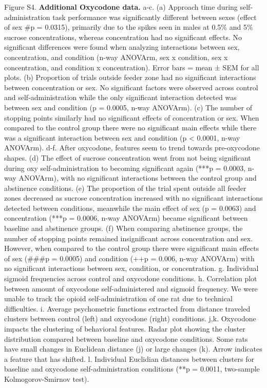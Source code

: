 \documentclass{article}
\begin{document}
\begin{singlespace}
    \noindent Figure S4. \textbf{Additional Oxycodone data.} a-c. (a) Approach time during self-administration task performance was significantly different
between sexes (effect of sex \#p = 0.0315), primarily due to the spikes seen in males at 0.5\% and
5\% sucrose concentrations, whereas concentration had no significant effects. No significant
differences were found when analyzing interactions between sex, concentration, and condition
(n-way ANOVArm, sex x condition, sex x concentration, and condition x concentration). Error bars
= mean ± SEM for all plots. (b) Proportion of trials outside feeder zone had no significant
interactions between concentration or sex. No significant factors were observed across control
and self-administration while the only significant interaction detected was between sex and
condition (p = 0.0005, n-way ANOVArm). (c) The number of stopping points similarly had no
significant effects of concentration or sex. When compared to the control group there were no
significant main effects while there was a significant interaction between sex and condition (p <
0.0001, n-way ANOVArm).
d-f. After oxycodone, features seem to trend towards pre-oxycodone shapes. (d) The effect of
sucrose concentration went from not being significant during oxy self-administration to becoming
significant again (***p = 0.0003, n-way ANOVArm), with no significant interactions between the
control group and abstinence conditions. (e) The proportion of the trial spent outside all feeder
zones decreased as sucrose concentration increased with no significant interactions detected
between conditions, meanwhile the main effect of sex (p = 0.0063) and concentration (***p =
0.0006, n-way ANOVArm) became significant between baseline and abstinence groups. (f) When
comparing abstinence groups, the number of stopping points remained insignificant across
concentration and sex. However, when compared to the control group there were significant main
effects of sex (\#\#\#p = 0.0005) and condition (++p = 0.006, n-way ANOVArm) with no significant
interactions between sex, condition, or concentration.
g. Individual sigmoid frequencies across control and oxycodone conditions.
h. Correlation plot between amount of oxycodone self-administered and sigmoid frequency. We
were unable to track the opioid self-administration of one rat due to technical difficulties.
i. Average psychometric functions extracted from distance traveled clusters between control (left)
and oxycodone (right) conditions.
j,k. Oxycodone impacts the clustering of behavioral features. Radar plot showing the cluster
distribution compared between baseline and oxycodone conditions. Some rats have small
changes in Euclidean distance (j) or large changes (k). Arrow indicates a feature that has
shifted.
l. Individual Euclidian distances between clusters for baseline and oxycodone self-administration
conditions (**p = 0.0011, two-sample Kolmogorov-Smirnov test).
\end{singlespace}
\end{document}
